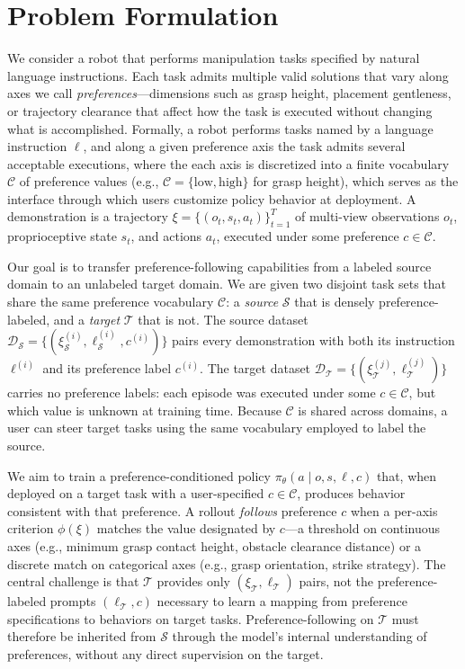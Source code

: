\documentclass{article}
\begin{document}


\section{Problem Formulation}
\label{sec:formulation}

We consider a robot that performs manipulation tasks specified by natural language instructions.
Each task admits multiple valid solutions that vary along axes we call \emph{preferences}---dimensions such as grasp height, placement gentleness, or trajectory clearance that affect how the task is executed without changing what is accomplished.
Formally, a robot performs tasks named by a language instruction $\ell$, and along a given preference axis the task admits several acceptable executions, where the each axis is discretized into a finite vocabulary $\mathcal{C}$ of preference values (e.g., $\mathcal{C}=\{\mathrm{low},\mathrm{high}\}$ for grasp height), which serves as the interface through which users customize policy behavior at deployment.
  A demonstration is a trajectory $\xi=\{(o_t,s_t,a_t)\}_{t=1}^{T}$ of multi-view observations $o_t$, proprioceptive state $s_t$, and actions $a_t$, executed under some preference $c\in\mathcal{C}$.


Our goal is to transfer preference-following capabilities from a labeled source domain to an unlabeled target domain.
We are given two disjoint task sets that share the same preference vocabulary $\mathcal{C}$: a \emph{source} $\mathcal{S}$ that is densely preference-labeled, and a \emph{target} $\mathcal{T}$ that is not.
The source dataset $\mathcal{D}_{\mathcal{S}}=\{(\xi_{\mathcal{S}}^{(i)},\ell_{\mathcal{S}}^{(i)},c^{(i)})\}$ pairs every demonstration with both its instruction $\ell^{(i)}$ and its preference label $c^{(i)}$.
The target dataset $\mathcal{D}_{\mathcal{T}}=\{(\xi_{\mathcal{T}}^{(j)},\ell_{\mathcal{T}}^{(j)})\}$ carries no preference labels: each episode was executed under some $c\in\mathcal{C}$, but which value is unknown at training time.
Because $\mathcal{C}$ is shared across domains, a user can steer target tasks using the same vocabulary employed to label the source.

We aim to train a preference-conditioned policy $\pi_{\theta}(a\mid o,s,\ell,c)$ that, when deployed on a target task with a user-specified $c\in\mathcal{C}$, produces behavior consistent with that preference.
A rollout \emph{follows} preference $c$ when a per-axis criterion $\phi(\xi)$ matches the value designated by $c$---a threshold on continuous axes (e.g., minimum grasp contact height, obstacle clearance distance) or a discrete match on categorical axes (e.g., grasp orientation, strike strategy).
The central challenge is that $\mathcal{T}$ provides only $(\xi_\mathcal{T},\ell_\mathcal{T})$ pairs, not the preference-labeled prompts $(\ell_\mathcal{T},c)$ necessary to learn a mapping from preference specifications to behaviors on target tasks.
Preference-following on $\mathcal{T}$ must therefore be inherited from $\mathcal{S}$ through the model's internal understanding of preferences, without any direct supervision on the target.
\end{document}
